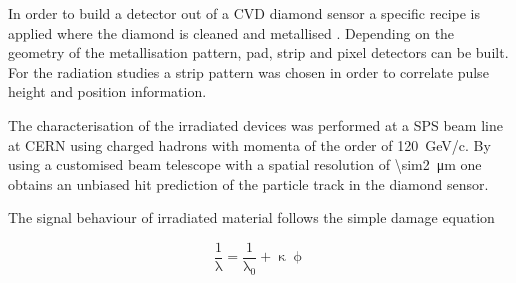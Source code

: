 In order to build a detector out of a \ac{CVD} diamond sensor a specific recipe is applied where the diamond is cleaned and metallised \cite{kagan}. Depending on the geometry of the metallisation pattern, pad, strip and pixel detectors can be built. For the radiation studies a strip pattern was chosen in order to correlate pulse height and position information.\par
The characterisation of the irradiated devices was performed at a \ac{SPS} beam line at CERN using charged hadrons with momenta of the order of \SI{120}{\giga\electronvolt/c}. By using a customised beam telescope with a spatial resolution of \SI{\sim2}{\micro\meter} one obtains an unbiased hit prediction of the particle track in the diamond sensor.\par
The signal behaviour of irradiated material follows the simple damage equation

\begin{equation}
	\frac{1}{\uplambda} = \frac{1}{\uplambda_0} + \upkappa\upphi \label{erad}
\end{equation}

